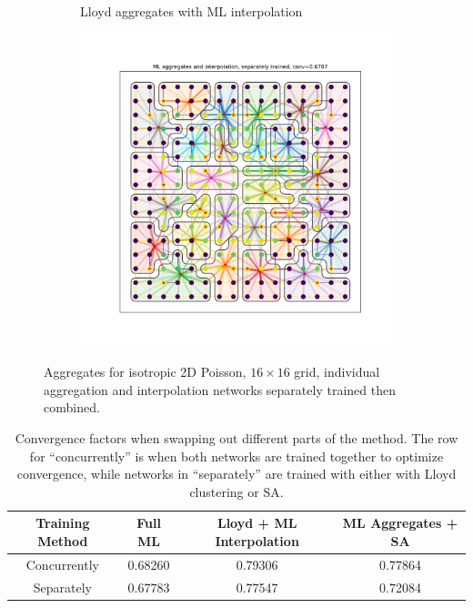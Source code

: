 \documentclass{article}
\begin{document}
\begin{figure}[h]
\begin{subfigure}[t]{0.49\textwidth}
    \caption{Lloyd aggregates with ML interpolation}
    \end{subfigure}
    \begin{subfigure}[t]{0.49\textwidth}
    \centering
    \includegraphics[width=\textwidth]{ablation.pdf}
  \end{subfigure}
  \caption{Aggregates for isotropic 2D Poisson, $16 \times 16$ grid, individual aggregation and interpolation networks separately trained then combined.}
  \label{fig:2d_isotropic}
\end{figure}

\begin{table}[h]
  \centering
  \begin{tabular}{|c|c|c|c|}
    \hline
    Training Method & Full ML & Lloyd + ML Interpolation & ML Aggregates + SA \\
    \hline
    Concurrently & 0.68260 & 0.79306 & 0.77864 \\
    Separately & 0.67783 & 0.77547 & 0.72084 \\
    \hline
  \end{tabular}
  \caption{Convergence factors when swapping out different parts of the method.  The row for ``concurrently'' is when both networks are trained together to optimize convergence, while networks in ``separately'' are trained with either with Lloyd clustering or SA.}
\end{table}
\end{document}
